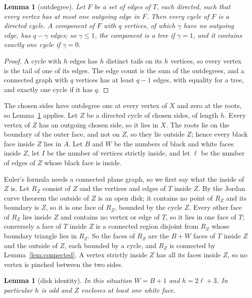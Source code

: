 \documentclass[10pt]{amsart}
\numberwithin{equation}{section}
\newtheorem{lemma}[equation]{Lemma}
\theoremstyle{definition}
\theoremstyle{remark}
\newcommand{\T}{T}
\begin{document}
\begin{lemma}[outdegree]\label{lem:outdegree}
Let $F$ be a set of edges of $\T$, each directed, such that every vertex has at most one outgoing edge in $F$.
Then every cycle of $F$ is a directed cycle.
A component of $F$ with $q$ vertices, of which $\gamma$ have no outgoing edge, has $q-\gamma$ edges; so $\gamma\le1$, the component is a tree if $\gamma=1$, and it contains exactly one cycle if $\gamma=0$.
\end{lemma}

\begin{proof}
A cycle with $h$ edges has $h$ distinct tails on its $h$ vertices, so every vertex is the tail of one of its edges.
The edge count is the sum of the outdegrees, and a connected graph with $q$ vertices has at least $q-1$ edges, with equality for a tree, and exactly one cycle if it has $q$.
\end{proof}

The chosen sides have outdegree one at every vertex of $X$ and zero at the roots, so Lemma~\ref{lem:outdegree} applies.
Let $Z$ be a directed cycle of chosen sides, of length $h$.
Every vertex of $Z$ has an outgoing chosen side, so it lies in $X$.
The roots lie on the boundary of the outer face, and not on $Z$, so they lie outside $Z$; hence every black face inside $Z$ lies in $A$.
Let $B$ and $W$ be the numbers of black and white faces inside $Z$, let $I$ be the number of vertices strictly inside, and let $\ell$ be the number of edges of $Z$ whose black face is inside.

Euler's formula needs a connected plane graph, so we first say what the inside of $Z$ is.
Let $R_Z$ consist of $Z$ and the vertices and edges of $\T$ inside $Z$.
By the Jordan curve theorem the outside of $Z$ is an open disk; it contains no point of $R_Z$ and its boundary is $Z$, so it is one face of $R_Z$, bounded by the cycle $Z$.
Every other face of $R_Z$ lies inside $Z$ and contains no vertex or edge of $\T$, so it lies in one face of $\T$; conversely a face of $\T$ inside $Z$ is a connected region disjoint from $R_Z$ whose boundary triangle lies in $R_Z$.
So the faces of $R_Z$ are the $B+W$ faces of $\T$ inside $Z$ and the outside of $Z$, each bounded by a cycle, and $R_Z$ is connected by Lemma~\ref{lem:connected}.
A vertex strictly inside $Z$ has all its faces inside $Z$, so no vertex is pinched between the two sides.

\begin{lemma}[disk identity]\label{lem:disk}
In this situation $W=B+1$ and $h=2\ell+3$.
In particular $h$ is odd and $Z$ encloses at least one white face.
\end{lemma}
\end{document}

